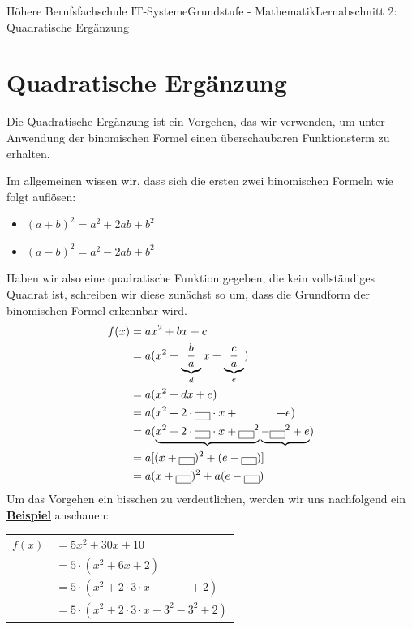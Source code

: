 \documentclass[11pt,twocolumn,oneside,openany,headings=optiontotoc,11pt,numbers=noenddot]{article}
\begin{document}
	\begin{worksheet}{Höhere Berufsfachschule IT-Systeme}{Grundstufe - Mathematik}{Lernabschnitt 2: Quadratische Ergänzung}
		\setcounter{section}{2}
		\section{Quadratische Ergänzung}
		Die Quadratische Ergänzung ist ein Vorgehen, das wir verwenden, um unter Anwendung der binomischen Formel einen überschaubaren Funktionsterm zu erhalten.\\
		\par\noindent
		Im allgemeinen wissen wir, dass sich die ersten zwei binomischen Formeln wie folgt auflösen:
		\begin{itemize}
			\item[] \((a+b)^2 = a^2 + 2ab + b^2\)
			\item[] \((a-b)^2 = a^2 - 2ab + b^2\)
		\end{itemize}
		Haben wir also eine quadratische Funktion gegeben, die kein vollständiges Quadrat ist, schreiben wir diese zunächst so um, dass die Grundform der binomischen Formel erkennbar wird.\\
		\begin{align*}
			f(x) & = ax^2 + bx +c\\
			& = a(x^2+\underbrace{\frac{b}{a}}_{d}x + \underbrace{\frac{c}{a}}_{e})\\
			& = a(x^2 + dx + e)\\
			& = a(x^2 + 2\cdot\fbox{\ \ }\cdot{}x +\ \ \ \ \ \ \ \ \ \ + e)\\
			& = a(\underbrace{x^2 + 2\cdot\fbox{\ \ }\cdot{}x + \fbox{\ \ }^2} \underbrace{- \fbox{\ \ }^2 + e})\\
			& = a[(x+\fbox{\ \ })^2 + (e-\fbox{\ \ })]\\
			& = a(x+\fbox{\ \ })^2 + a(e-\fbox{\ \ })
		\end{align*}
		Um das Vorgehen ein bisschen zu verdeutlichen, werden wir uns nachfolgend ein \underline{\textbf{Beispiel}} anschauen:\\
		\par\noindent
		\begin{tabularx}{0.48\textwidth}{lX}
			\(f(x)\) & \( = 5x^2 + 30x +10\)\\
			& \(= 5\cdot(x^2 + 6x + 2)\)\\
			& \(= 5\cdot(x^2 + 2\cdot{}3\cdot{}x +\ \ \ \ \ \ \ \ \ \ + 2)\)\\
			& \(= 5\cdot(x^2 + 2\cdot{}3\cdot{}x + 3^2 - 3^2 + 2)\)\\

\end{tabularx}
\end{worksheet}
\end{document}
